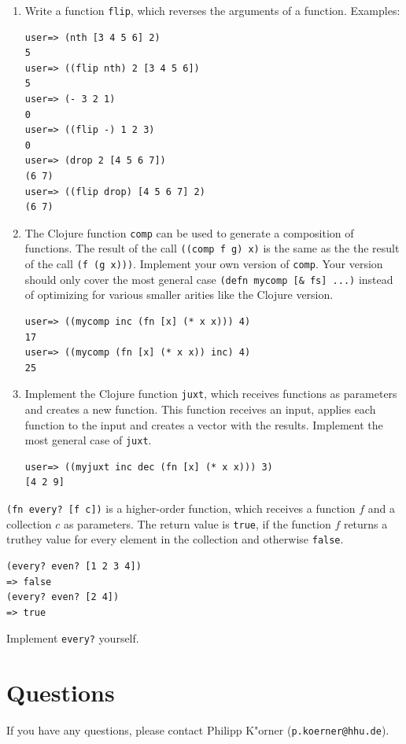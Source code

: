 \documentclass[11pt,a4paper]{article}
\begin{document}
\begin{exercise}
\begin{enumerate}[label=\alph*)]

 \item Write a function \texttt{flip}, which reverses the arguments of a function.
 Examples:
 \begin{verbatim}
user=> (nth [3 4 5 6] 2)
5
user=> ((flip nth) 2 [3 4 5 6])
5
user=> (- 3 2 1)
0
user=> ((flip -) 1 2 3)
0
user=> (drop 2 [4 5 6 7])
(6 7)
user=> ((flip drop) [4 5 6 7] 2)
(6 7) \end{verbatim}
\item The Clojure function \texttt{comp} can be used to generate a composition of functions. The result of the call \texttt{((comp f g) x)} is the same as the the result of the call \texttt{(f (g x)))}. Implement your own version of \texttt{comp}. Your version should only cover the most general case \texttt{(defn mycomp [\& fs] ...)} instead of optimizing for various smaller arities like the Clojure version. 

\begin{verbatim}
user=> ((mycomp inc (fn [x] (* x x))) 4)
17
user=> ((mycomp (fn [x] (* x x)) inc) 4)
25 \end{verbatim}



\item Implement the Clojure function \texttt{juxt}, which receives functions as parameters and creates a new function. This function receives an input, applies each function to the input and creates a vector with the results. Implement the most general case of \texttt{juxt}.

\begin{verbatim}
user=> ((myjuxt inc dec (fn [x] (* x x))) 3)
[4 2 9] \end{verbatim}

\end{enumerate}
\end{exercise}



\begin{exercise}
    \texttt{(fn every? [f c])} is a higher-order function, which receives a function $f$ and a collection $c$ as parameters. 
    The return value is \texttt{true}, if the function $f$ returns a truthey value for every element in the collection and otherwise \texttt{false}.

    \begin{verbatim}
(every? even? [1 2 3 4]) 
=> false
(every? even? [2 4])
=> true \end{verbatim}

    Implement \texttt{every?} yourself.
\end{exercise}


\section*{Questions}
If you have any questions, please contact Philipp K"orner (\texttt{p.koerner@hhu.de}).
\end{document}

